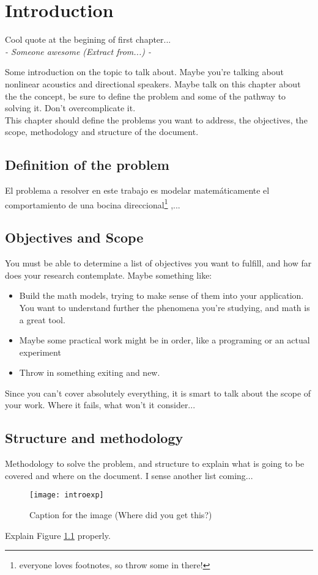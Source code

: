 \chapter{Introduction}
\begin{flushright}
Cool quote at the begining of first chapter...\\
\emph{- Someone awesome (Extract from...) -}
\end{flushright}
Some introduction on the topic to talk about. Maybe you're talking about nonlinear 
acoustics and directional speakers. Maybe talk on this chapter about the the concept,
be sure to define the problem and some of the pathway to solving it. Don't 
overcomplicate it. \medskip\\
This chapter should define the problems you want to address, the objectives, the 
scope, methodology and structure of the document.
\section{Definition of the problem} %
El problema a resolver en este trabajo es modelar matemáticamente el comportamiento 
de una bocina direccional\footnote{everyone loves footnotes, so throw some in there!}
,...
\section{Objectives and Scope}
You must be able to determine a list of objectives you want to fulfill, and how far
does your research contemplate. Maybe something like:
\begin{itemize}
\item Build the math models, trying to make sense of them into your application. You 
want to understand further the phenomena you're studying, and math is a great tool.
\item Maybe some practical work might be in order, like a programing or an actual 
experiment
\item Throw in something exiting and new.
\end{itemize}
Since you can't cover absolutely everything, it is smart to talk about the scope of
your work. Where it fails, what won't it consider...
\section{Structure and methodology}
Methodology to solve the problem, and structure to explain what is going to be 
covered and where on the document. I sense another list coming...
\begin{figure}[hbpt]
\centering
\texttt{[image: introexp]}
\caption{Caption for the image (Where did you get this?)}
\label{fig:introexp}
\end{figure}
Explain Figure \ref{fig:introexp} properly. 